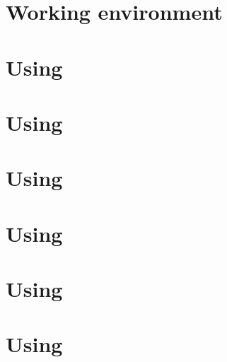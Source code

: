 \documentclass[openany]{book}
\begin{document}
\fancyhf{}
\fancyhead[LE]{\small\truncate{6cm}{\leftmark}}
\fancyhead[LO]{\small\truncate{6cm}{\rightmark}}
\fancyfoot[C]{\thepage}  %

 \makeatletter
 \let\ps@plain\ps@fancy
 \makeatother



\chapter{Working environment \label{ch:workEnv}}


\chapter{Using \swConverter \label{ch:swConverter}}



\chapter{Using \swConverterReverse \label{ch:swConverterReverse}}

\chapter{Using \swNSPreProcess \label{ch:swNSPreProcess}}


\chapter{Using \swZone \label{ch:swZone}}


\chapter{Using \swPorosityMapper \label{ch:swPorosityMapper}}



% 
\chapter{Using \swSolver \label{ch:swSolver}}







%

\end{document}
